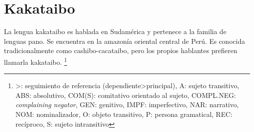 \section*{Kakataibo}

\noindent La lengua kakataibo es hablada en Sudamérica y pertenece a la familia de lenguas pano. Se encuentra en la amazonía oriental central de Perú.
Es conocida tradicionalmente como cashibo-cacataibo, pero los propios hablantes prefieren llamarla kakataibo.
\footnote{>: seguimiento de referencia (dependiente>principal), A: sujeto transitivo, ABS: absolutivo, COM(S): comitativo orientado al sujeto, COMPL.NEG: \textit{complaining negator}, GEN: genitivo, IMPF: imperfectivo, NAR: narrativo, NOM: nominalizador, O: objeto transitivo, P: persona gramatical, REC: recíproco, S: sujeto intransitivo}
\vspace{0.5cm}

